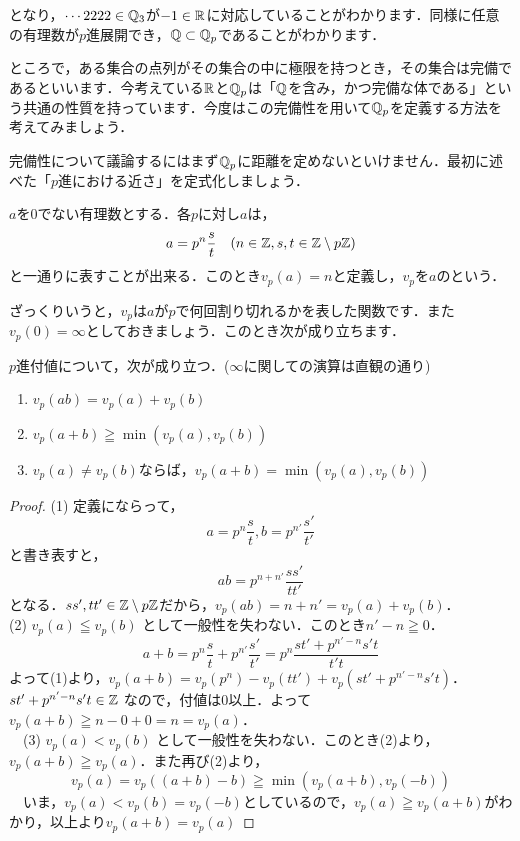 \documentclass[./main]{subfiles}
\begin{document}
となり，$\cdots 2222\in \mathbb{Q}_3$が$-1\in\mathbb{R}$に対応していることがわかります．同様に任意の有理数が$p$進展開でき，$\mathbb{Q} \subset \mathbb{Q}_p$であることがわかります．

ところで，ある集合の点列がその集合の中に極限を持つとき，その集合は完備であるといいます．今考えている$\mathbb{R}$と$\mathbb{Q}_p$は「$\mathbb{Q}$を含み，かつ完備な体である」という共通の性質を持っています．今度はこの完備性を用いて$\mathbb{Q}_p$を定義する方法を考えてみましょう．


完備性について議論するにはまず$\mathbb{Q}_p$に距離を定めないといけません．最初に述べた「$p$進における近さ」を定式化しましょう．

\begin{defi}
$a$を0でない有理数とする．各$p$に対し$a$は，
\[
a=p^n \frac{s}{t} \quad (n\in \mathbb{Z}, s,t \in \mathbb{Z} \setminus p\mathbb{Z} )
\]
と一通りに表すことが出来る．このとき$v_p(a)=n$と定義し，$v_p$を$a$のという．
\end{defi}

ざっくりいうと，$v_p$は$a$が$p$で何回割り切れるかを表した関数です．また$v_p(0)=\infty$としておきましょう．このとき次が成り立ちます．

\begin{prop}
$p$進付値について，次が成り立つ．($\infty$に関しての演算は直観の通り)
\begin{enumerate}
  \renewcommand{\labelenumi}{(\arabic{enumi})}
\item $v_p(ab)=v_p(a)+v_p(b)$
\item $v_p(a+b) \geqq \min(v_p(a),v_p(b))$
\item $v_p(a) \neq v_p(b)$ならば，$v_p(a+b)=\min(v_p(a),v_p(b))$
\end{enumerate}
\end{prop}

\begin{proof}
	(1) 定義にならって，
	\[
	a=p^n \frac{s}{t},b=p^{n'} \frac{s'}{t'}
	\]
	と書き表すと，
	\[
	ab=p^{n+n'}\frac{ss'}{tt'}
	\]
	となる．$ss',tt' \in \mathbb{Z} \setminus p\mathbb{Z}$だから，$v_p(ab)=n+n'=v_p(a)+v_p(b)$． \\
	(2) $v_p(a) \leqq v_p(b)$ として一般性を失わない．このとき$n'-n \geqq 0$．
　\[
　a+b=p^n \frac{s}{t} + p^{n'} \frac{s'}{t'} = p^n\frac{st'+p^{n'-n}s't}{t't}
　\]
	よって(1)より，$v_p(a+b) = v_p(p^n) - v_p(tt') + v_p(st'+p^{n'-n}s't)$．$st'+p^{n'-n}s't \in \mathbb{Z}$ なので，付値は0以上．よって$v_p(a+b) \geqq n-0+0 =n= v_p(a)$．\\
　(3) $v_p(a) < v_p(b)$ として一般性を失わない．このとき(2)より，$v_p(a+b) \geqq v_p(a)$．また再び(2)より，
　\[
　v_p(a)=v_p((a+b)-b) \geqq \min(v_p(a+b),v_p(-b))
　\]
　いま，$v_p(a) < v_p(b)=v_p(-b)$としているので，$v_p(a) \geqq v_p(a+b)$がわかり，以上より$v_p(a+b)=v_p(a)$
\end{proof}
\end{document}
